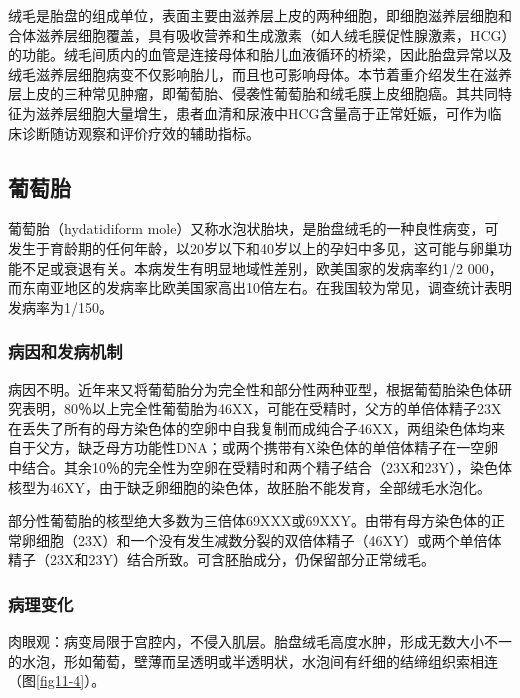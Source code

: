 绒毛是胎盘的组成单位，表面主要由滋养层上皮的两种细胞，即细胞滋养层细胞和合体滋养层细胞覆盖，具有吸收营养和生成激素（如人绒毛膜促性腺激素，HCG）的功能。绒毛间质内的血管是连接母体和胎儿血液循环的桥梁，因此胎盘异常以及绒毛滋养层细胞病变不仅影响胎儿，而且也可影响母体。本节着重介绍发生在滋养层上皮的三种常见肿瘤，即葡萄胎、侵袭性葡萄胎和绒毛膜上皮细胞癌。其共同特征为滋养层细胞大量增生，患者血清和尿液中HCG含量高于正常妊娠，可作为临床诊断随访观察和评价疗效的辅助指标。

\subsection{葡萄胎}

葡萄胎（hydatidiform
mole）又称水泡状胎块，是胎盘绒毛的一种良性病变，可发生于育龄期的任何年龄，以20岁以下和40岁以上的孕妇中多见，这可能与卵巢功能不足或衰退有关。本病发生有明显地域性差别，欧美国家的发病率约1/2
000，而东南亚地区的发病率比欧美国家高出10倍左右。在我国较为常见，调查统计表明发病率为1/150。

\subsubsection{病因和发病机制}

病因不明。近年来又将葡萄胎分为完全性和部分性两种亚型，根据葡萄胎染色体研究表明，80％以上完全性葡萄胎为46XX，可能在受精时，父方的单倍体精子23X在丢失了所有的母方染色体的空卵中自我复制而成纯合子46XX，两组染色体均来自于父方，缺乏母方功能性DNA；或两个携带有X染色体的单倍体精子在一空卵中结合。其余10％的完全性为空卵在受精时和两个精子结合（23X和23Y），染色体核型为46XY，由于缺乏卵细胞的染色体，故胚胎不能发育，全部绒毛水泡化。

部分性葡萄胎的核型绝大多数为三倍体69XXX或69XXY。由带有母方染色体的正常卵细胞（23X）和一个没有发生减数分裂的双倍体精子（46XY）或两个单倍体精子（23X和23Y）结合所致。可含胚胎成分，仍保留部分正常绒毛。

\subsubsection{病理变化}

肉眼观：病变局限于宫腔内，不侵入肌层。胎盘绒毛高度水肿，形成无数大小不一的水泡，形如葡萄，壁薄而呈透明或半透明状，水泡间有纤细的结缔组织索相连（图\ref{fig11-4}）。

